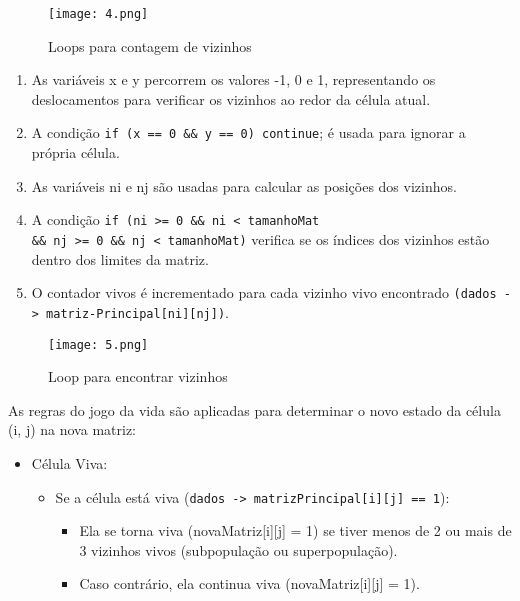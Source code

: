 \documentclass[a4paper,12pt]{article}
\begin{document}
\begin{figure}[H]
        \centering
        \texttt{[image: 4.png]}
        \caption{Loops para contagem de vizinhos}
        \label{fig:enter-label13}
\end{figure}

\begin{enumerate}
    \item As variáveis x e y percorrem os valores -1, 0 e 1, representando os deslocamentos para verificar os vizinhos ao redor da célula atual.
    \item A condição \texttt{if (x == 0 \&\& y == 0) continue}; é usada para ignorar a própria célula.
    \item As variáveis ni e nj são usadas para calcular as posições dos vizinhos.
    \item A condição \texttt{if (ni >= 0 \&\& ni < tamanhoMat \\
    \&\& nj >= 0 \&\& nj < tamanhoMat)} verifica se os índices dos vizinhos estão dentro dos limites da matriz.

    \item O contador vivos é incre\-men\-tado para cada vizinho vivo encontrado \texttt{(dados\ -> matriz-Principal[ni][nj])}.

\end{enumerate}

\begin{figure}[H]
        \centering
        \texttt{[image: 5.png]}
        \caption{Loop para encontrar vizinhos}
        \label{fig:enter-label14}
\end{figure}

As regras do jogo da vida são aplicadas para determinar o novo estado da célula (i, j) na nova matriz:



\begin{itemize}
    \item Célula Viva:
        \begin{itemize}
             \item Se a célula está viva (\texttt{dados -> matrizPrincipal[i][j] == 1}):
                \begin{itemize}
                    \item Ela se torna viva (novaMatriz[i][j] = 1) se tiver menos de 2 ou mais de 3 vizinhos vivos (subpopulação ou superpopulação).
                    \item Caso contrário, ela continua viva (novaMatriz[i][j] = 1).
                \end{itemize}
        \end{itemize}
\end{itemize}
\end{document}
